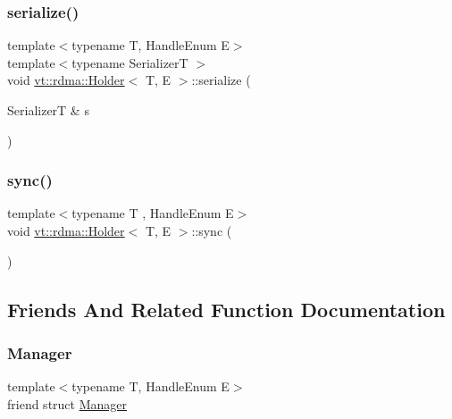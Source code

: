 \subsubsection{\texorpdfstring{serialize()}{serialize()}}
{\footnotesize\ttfamily template$<$typename T, Handle\+Enum E$>$ \\
template$<$typename SerializerT $>$ \\
void \hyperlink{structvt_1_1rdma_1_1_holder}{vt\+::rdma\+::\+Holder}$<$ T, E $>$\+::serialize (\begin{DoxyParamCaption}\item[{SerializerT \&}]{s }\end{DoxyParamCaption})\hspace{0.3cm}{\ttfamily [inline]}}

\mbox{\label{structvt_1_1rdma_1_1_holder_a85d338b1beb4c041aa477b18c4eaa312}} 
\subsubsection{\texorpdfstring{sync()}{sync()}}
{\footnotesize\ttfamily template$<$typename T , Handle\+Enum E$>$ \\
void \hyperlink{structvt_1_1rdma_1_1_holder}{vt\+::rdma\+::\+Holder}$<$ T, E $>$\+::sync (\begin{DoxyParamCaption}{ }\end{DoxyParamCaption})}



\subsection{Friends And Related Function Documentation}
\mbox{\label{structvt_1_1rdma_1_1_holder_a1fd6b9bc3f72bb2b64e602de3982929d}} 
\subsubsection{\texorpdfstring{Manager}{Manager}}
{\footnotesize\ttfamily template$<$typename T, Handle\+Enum E$>$ \\
friend struct \hyperlink{structvt_1_1rdma_1_1_manager}{Manager}\hspace{0.3cm}{\ttfamily [friend]}}



